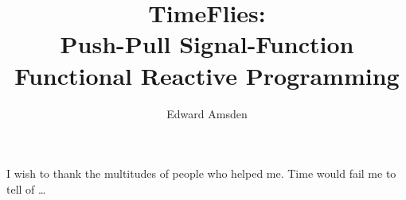 \documentclass[12pt]{report}    %
\author{Edward Amsden }    %
\title{TimeFlies: \\ Push-Pull Signal-Function \\ Functional Reactive Programming}
\theoremstyle{definition}
\theoremstyle{remark}
\begin{document}


%
%
%
\titlepage              %
\commcertpage           %




%


\begin{acknowledgments}     %
%
I wish to thank the multitudes of people who helped me. Time would
fail me to tell of \ldots
\end{acknowledgments}


%
\utabstract
{}%
\indent




\tableofcontents   %

\listoffigures     %



%
%
\end{document}
